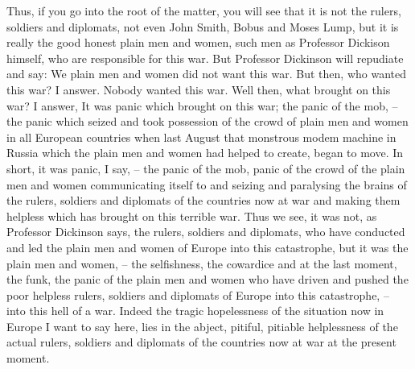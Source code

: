 Thus, if you go into the root of the matter, you will see that it is not the rulers, soldiers and diplomats, not even John Smith, Bobus and Moses Lump, but it is really the good honest plain men and women, such men as Professor Dickison himself, who are responsible for this war. But Professor Dickinson will repudiate and say: We plain men and women did not want this war. But then, who wanted this war? I answer. Nobody wanted this war. Well then, what brought on this war? I answer, It was panic which brought on this war; the panic of the mob,  -- the panic which seized and took possession of the crowd of plain men and women in all European countries when last August that monstrous modem machine in Russia which the plain men and women had helped to create, began to move.
In short, it was panic, I say,
-- the panic of the mob, panic of the crowd of the plain men and women communicating itself to and seizing and paralysing the brains of the rulers,
soldiers and diplomats of the countries now at war and making them helpless which has brought on this terrible war.
Thus we see, it was not, as Professor Dickinson says, the rulers, soldiers and diplomats,
who have conducted and led the plain men and women of Europe into this catastrophe,
but it was the plain men and women,
--  the selfishness, the cowardice and at the last moment, the funk,
the panic of the plain men and women who have driven and pushed the poor helpless rulers,
soldiers and diplomats of Europe into this catastrophe,
-- into this hell of a war.
Indeed the tragic hopelessness of the situation now in Europe I want to say here,
lies in the abject, pitiful, pitiable helplessness of the actual rulers,
soldiers and diplomats of the countries now at war at the present moment.

